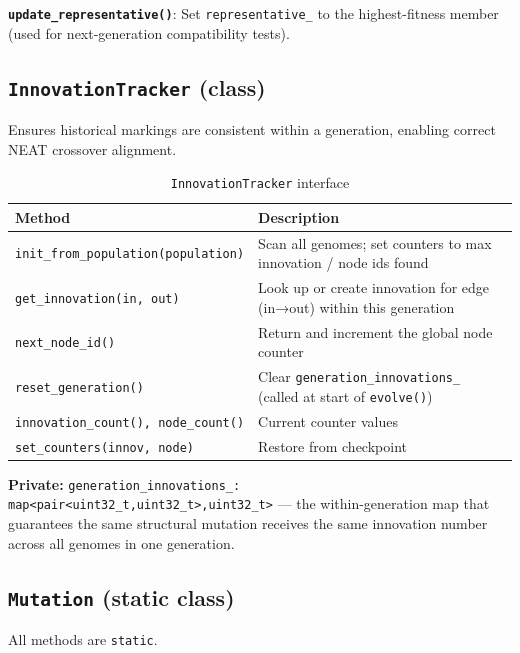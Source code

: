 \textbf{\texttt{update\_representative()}}: Set \texttt{representative\_} to the
highest-fitness member (used for next-generation compatibility tests).

\subsection{\texttt{InnovationTracker} (class)}

Ensures historical markings are consistent within a generation, enabling correct NEAT
crossover alignment.

\begin{table}[H]
\centering\small
\caption{\texttt{InnovationTracker} interface}
\begin{tabularx}{\textwidth}{@{}lX@{}}
\toprule
\textbf{Method} & \textbf{Description} \\
\midrule
\texttt{init\_from\_population(population)} & Scan all genomes; set counters to max innovation / node ids found \\
\texttt{get\_innovation(in, out)} & Look up or create innovation for edge (in→out) within this generation \\
\texttt{next\_node\_id()} & Return and increment the global node counter \\
\texttt{reset\_generation()} & Clear \texttt{generation\_innovations\_} (called at start of \texttt{evolve()}) \\
\texttt{innovation\_count(), node\_count()} & Current counter values \\
\texttt{set\_counters(innov, node)} & Restore from checkpoint \\
\bottomrule
\end{tabularx}
\end{table}

\textbf{Private:} \texttt{generation\_innovations\_: map<pair<uint32\_t,uint32\_t>,\allowbreak uint32\_t>}
— the within-generation map that guarantees the same structural mutation receives the
same innovation number across all genomes in one generation.

\subsection{\texttt{Mutation} (static class)}

All methods are \texttt{static}.

